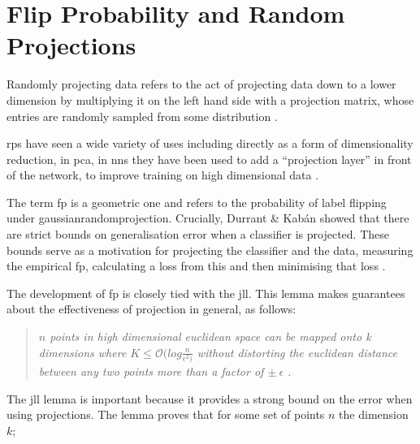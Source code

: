 


\section{Flip Probability and Random Projections}


Randomly projecting data refers to the act of projecting data down to a lower dimension by multiplying it on the left hand side with a projection matrix, whose entries are randomly sampled from some distribution \cite{bob_learning_high_dim}.

\gls{rp}s have seen a wide variety of uses including directly as a form of dimensionality reduction, in \gls{pca}, in \gls{nn}s they have been used to add a \enquote{projection layer} in front of the network, to improve training on high dimensional data \cite{random_project_high_d}.

The term \gls{fp} is a geometric one and refers to the probability of label flipping under \gls{gaussianrandomprojection}. Crucially, Durrant \& Kab\'an showed that there are strict bounds on generalisation error when a classifier is projected. These bounds serve as a motivation for projecting the classifier and the data, measuring the empirical \gls{fp}, calculating a loss from this and then minimising that loss \cite{bob_sharp_generalisation_error_bounds}.
\bigskip 

The development of \gls{fp} is closely tied with the \gls{jll}. This lemma makes guarantees about the effectiveness of projection in general, as follows:

\begin{quote}
    \textit{$n$ points in high dimensional euclidean space can be mapped onto k dimensions where $K \leq \mathcal{O}(log \frac{n}{\epsilon^{2})} $ without distorting the euclidean distance between any two points more than a factor of $\pm \: \epsilon$ \cite{jll_notes}.}
\end{quote}

The \gls{jll} lemma is important because it provides a strong bound on the error when using projections. The lemma proves that for some set of points $n$ the dimension $k$;

